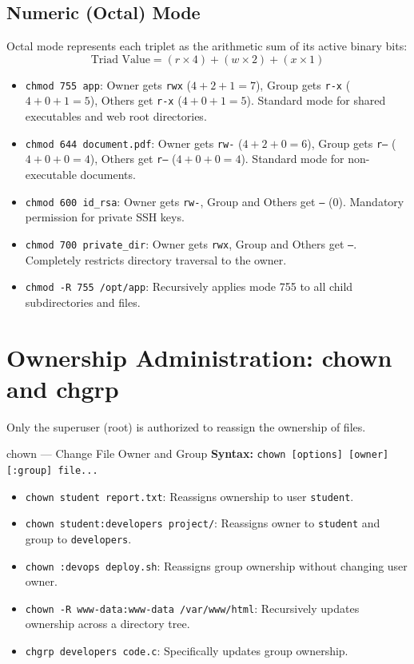 \subsection{Numeric (Octal) Mode}
Octal mode represents each triplet as the arithmetic sum of its active binary bits:
\begin{equation}
\text{Triad Value} = (r \times 4) + (w \times 2) + (x \times 1)
\end{equation}
\begin{itemize}[leftmargin=1.5em]
    \item \texttt{chmod 755 app}: Owner gets \texttt{rwx} ($4+2+1=7$), Group gets \texttt{r-x} ($4+0+1=5$), Others get \texttt{r-x} ($4+0+1=5$). Standard mode for shared executables and web root directories.
    \item \texttt{chmod 644 document.pdf}: Owner gets \texttt{rw-} ($4+2+0=6$), Group gets \texttt{r--} ($4+0+0=4$), Others get \texttt{r--} ($4+0+0=4$). Standard mode for non-executable documents.
    \item \texttt{chmod 600 id\_rsa}: Owner gets \texttt{rw-}, Group and Others get \texttt{---} ($0$). Mandatory permission for private SSH keys.
    \item \texttt{chmod 700 private\_dir}: Owner gets \texttt{rwx}, Group and Others get \texttt{---}. Completely restricts directory traversal to the owner.
    \item \texttt{chmod -R 755 /opt/app}: Recursively applies mode 755 to all child subdirectories and files.
\end{itemize}

\section{Ownership Administration: chown and chgrp}
Only the superuser (root) is authorized to reassign the ownership of files.
\begin{commandbox}{chown --- Change File Owner and Group}
\textbf{Syntax:} \texttt{chown [options] [owner][:group] file...}
\begin{itemize}[leftmargin=1.5em]
    \item \texttt{chown student report.txt}: Reassigns ownership to user \texttt{student}.
    \item \texttt{chown student:developers project/}: Reassigns owner to \texttt{student} and group to \texttt{developers}.
    \item \texttt{chown :devops deploy.sh}: Reassigns group ownership without changing user owner.
    \item \texttt{chown -R www-data:www-data /var/www/html}: Recursively updates ownership across a directory tree.
    \item \texttt{chgrp developers code.c}: Specifically updates group ownership.
\end{itemize}
\end{commandbox}

